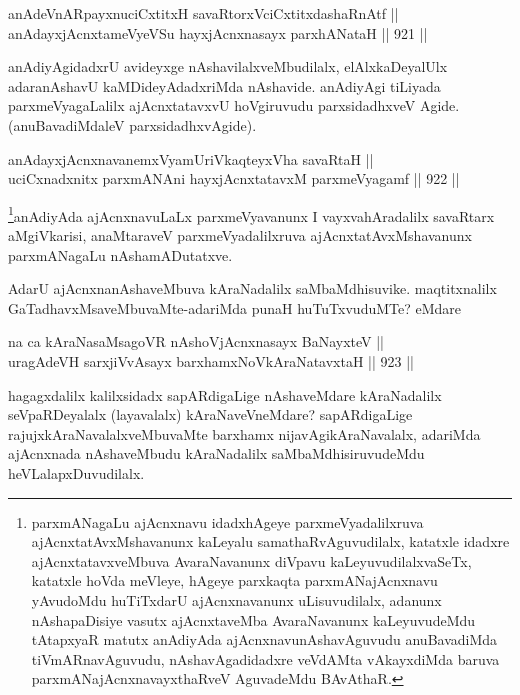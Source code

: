 \begin{shl}
anAdeVnARpayxnuciCxtitxH savaRtorxVciCxtitxdashaRnAtf || \\
anAdayxjAcnxtameVyeVSu hayxjAcnxnasayx parxhANataH \hfill || 921 ||  
\end{shl}

\begin{artha}
anAdiyAgidadxrU avideyxge nAshavilalxveMbudilalx, elAlxkaDeyalUlx adaranAshavU kaMDideyAdadxriMda nAshavide. anAdiyAgi tiLiyada parxmeVyagaLalilx ajAcnxtatavxvU hoVgiruvudu parxsidadhxveV Agide.(anuBavadiMdaleV parxsidadhxvAgide).
\end{artha}


\begin{shl}
anAdayxjAcnxnavanemxVyamUriVkaqteyxVha savaRtaH || \\
uciCxnadxnitx parxmANAni hayxjAcnxtatavxM parxmeVyagamf \hfill || 922 ||  
\end{shl}

\begin{artha}
\footnote{parxmANagaLu ajAcnxnavu idadxhAgeye parxmeVyadalilxruva ajAcnxtatAvxMshavanunx kaLeyalu samathaRvAguvudilalx, katatxle idadxre ajAcnxtatavxveMbuva AvaraNavanunx diVpavu kaLeyuvudilalxvaSeTx, katatxle hoVda meVleye, hAgeye parxkaqta parxmANajAcnxnavu yAvudoMdu huTiTxdarU ajAcnxnavanunx uLisuvudilalx, adanunx nAshapaDisiye vasutx ajAcnxtaveMba AvaraNavanunx kaLeyuvudeMdu tAtapxyaR matutx anAdiyAda ajAcnxnavunAshavAguvudu anuBavadiMda tiVmARnavAguvudu, nAshavAgadidadxre veVdAMta vAkayxdiMda baruva parxmANajAcnxnavayxthaRveV AguvadeMdu BAvAthaR.}anAdiyAda ajAcnxnavuLaLx parxmeVyavanunx I vayxvahAradalilx savaRtarx aMgiVkarisi, anaMtaraveV parxmeVyadalilxruva ajAcnxtatAvxMshavanunx parxmANagaLu nAshamADutatxve.
\end{artha}

\begin{artha}
AdarU ajAcnxnanAshaveMbuva kAraNadalilx saMbaMdhisuvike. maqtitxnalilx GaTadhavxMsaveMbuvaMte-adariMda punaH huTuTxvuduMTe? eMdare\ndash 
\end{artha}

\begin{shl}
na ca kAraNasaMsagoVR nAshoV\s jAcnxnasayx BaNayxteV || \\
uragAdeVH sarxjiVvAsayx barxhamxNoV\s kAraNatavxtaH \hfill || 923 ||  
\end{shl}

\begin{artha}
hagagxdalilx kalilxsidadx sapARdigaLige nAshaveMdare kAraNadalilx seVpaRDeyalalx (layavalalx) kAraNaveVneMdare? sapARdigaLige rajujxkAraNavalalxveMbuvaMte barxhamx nijavAgikAraNavalalx, adariMda ajAcnxnada nAshaveMbudu kAraNadalilx saMbaMdhisiruvudeMdu heVLalapxDuvudilalx.
\end{artha}

